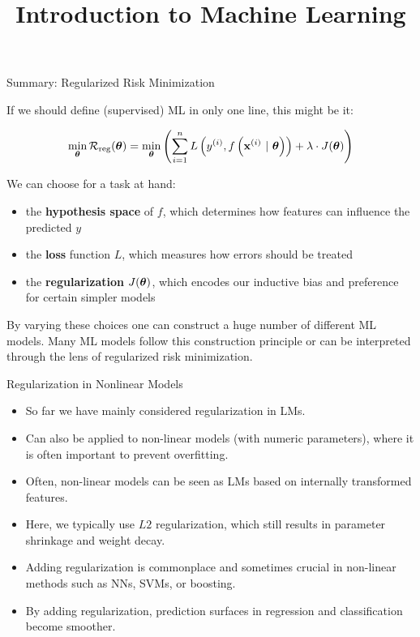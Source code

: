 \documentclass[11pt,compress,t,notes=noshow, xcolor=table]{beamer}
\title{Introduction to Machine Learning}
\date{}
\begin{document}


\begin{vbframe}{Summary: Regularized Risk Minimization}

If we should define (supervised) ML in only one line, this might be it:

$$
\min_{\bm{\theta}} \mathcal{R}_{\text{reg}}(\bm{\theta})= \min_{\bm{\theta}} \left(\sum\limits_{i=1}^n L\left(y^{(i)}, f\left(\mathbf{x}^{(i)} ~|~ \bm{\theta}\right)\right) + \lambda \cdot J(\bm{\theta}) \right)
$$

We can choose for a task at hand:

\begin{itemize}
  \item the \textbf{hypothesis space} of $f$, which determines how features can 
  influence the predicted $y$
  \item the \textbf{loss} function $L$, which measures how errors should be treated
  \item the \textbf{regularization} $J(\bm{\theta})$, which encodes our inductive 
  bias and preference for certain simpler models
\end{itemize}

\vfill

By varying these choices one can construct a huge number of different ML models. 
Many ML models follow this construction principle or can be interpreted through 
the lens of regularized risk minimization.

\end{vbframe}


\begin{vbframe}{Regularization in Nonlinear Models}

\begin{itemize}
  \item So far we have mainly considered regularization in LMs.
  \item Can also be applied to non-linear models (with numeric parameters), where it is 
  often important to prevent overfitting.
    \item Often, non-linear models can be seen as LMs based on internally transformed features.  
  \item Here, we typically use $L2$ regularization, which
    still results in parameter shrinkage and weight decay.
  \item Adding regularization is commonplace and sometimes crucial in non-linear methods such as NNs, SVMs, or boosting.
  \item By adding regularization, prediction surfaces in regression and 
  classification become smoother. 
\end{itemize}

\end{vbframe}
\end{document}
